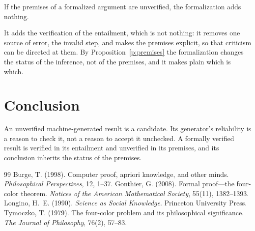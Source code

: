 \documentclass{situationist-preprint}
\begin{document}
\begin{objection}
If the premises of a formalized argument are unverified, the formalization adds nothing.
\end{objection}

\begin{reply}
It adds the verification of the entailment, which is not nothing: it removes one source of error, the invalid step, and makes the premises explicit, so that criticism can be directed at them. By Proposition~\ref{p:premises} the formalization changes the status of the inference, not of the premises, and it makes plain which is which.
\end{reply}

\section{Conclusion}

An unverified machine-generated result is a candidate. Its generator's reliability is a reason to check it, not a reason to accept it unchecked. A formally verified result is verified in its entailment and unverified in its premises, and its conclusion inherits the status of the premises.

\begin{thebibliography}{99}\small
{} Burge, T. (1998). Computer proof, apriori knowledge, and other minds. \emph{Philosophical Perspectives}, 12, 1--37.
 Gonthier, G. (2008). Formal proof---the four-color theorem. \emph{Notices of the American Mathematical Society}, 55(11), 1382--1393.
 Longino, H.~E. (1990). \emph{Science as Social Knowledge}. Princeton University Press.
 Tymoczko, T. (1979). The four-color problem and its philosophical significance. \emph{The Journal of Philosophy}, 76(2), 57--83.
\end{thebibliography}
\end{document}
